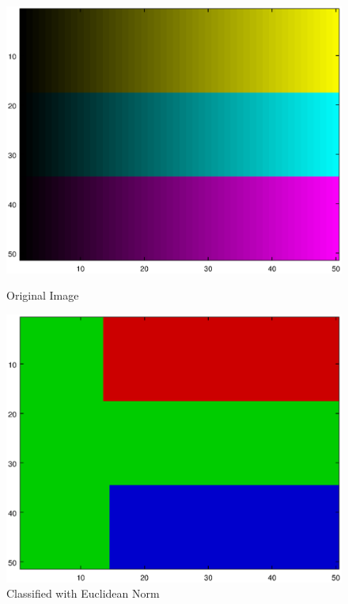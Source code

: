 \documentclass[12pt]{article}
\begin{document}
\begin{figure}
\begin{minipage}{.45\textwidth}
  \includegraphics[width=\linewidth]{./Images/simpleStripes/image.eps}
  \caption{Original Image}
  \label{fig:StripeOriginal}
\end{minipage}\hfill
\begin{minipage}{.45\textwidth}
  \includegraphics[width=\linewidth]{./Images/simpleStripes/badClassify.eps}
  \caption{Classified with Euclidean Norm}
  \label{fig:StripeEuclidean}
\end{minipage}
\end{figure}
\end{document}
